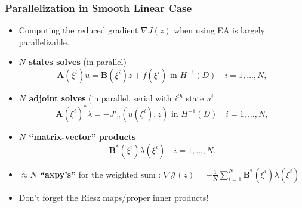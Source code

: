 \documentclass[aspectratio=169,xcolor=dvipsnames,10pt]{beamer}
\newcommand{\cJ}{\mathcal{J}}
\begin{document}
\begin{frame}\frametitle{Parallelization in Smooth Linear Case}
\begin{exampleblock}{}
\begin{itemize}
\item Computing the reduced gradient $\nabla J(z)$ when using EA is largely parallelizable.
\item \textbf{$N$ states solves} (in parallel)
\[
\bm A(\xi^i) u = \bm B(\xi^i) z + f(\xi^i) \text{ in } H^{-1}(D)\quad i =1,\dots, N,
\]
\item \textbf{$N$ adjoint solves} (in parallel, serial with $i^{th}$ state $u^i$
\[
\bm A(\xi^i)^* \lambda = -J'_u(u(\xi^i),z) \text{ in } H^{-1}(D)\quad i =1,\dots, N,
\]
\item \textbf{$N$ ``matrix-vector''  products}
\[
\bm B ^*(\xi^i) \lambda(\xi^i) \quad i = 1,\dots, N.
\]
\item \textbf{$\approx N$ ``axpy's''} for the weighted sum : $\nabla \mathcal{J}(z) = -\frac{1}{N}\sum_{i=1}^N \bm B ^*(\xi^i) \lambda(\xi^i)$
\item \alert{Don't forget the Riesz maps/proper inner products}!
\end{itemize}
\end{exampleblock}
\end{frame}
\end{document}
